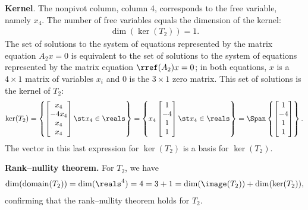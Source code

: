 {\textbf{Kernel}. The nonpivot column, column 4, corresponds to the free variable, namely $x_{4}$. The number of free variables equals the dimension of the kernel:
\begin{align*}
\dim(\ker(T_{2}))
=
1.
\end{align*}
The set of solutions to the system of equations represented by the matrix equation $A_{2} x = 0$ is equivalent to the set of solutions to the system of equations represented by the matrix equation $\rref(A_{2}) x = 0$; in both equations, $x$ is a $4 \times 1$ matrix of variables $x_{i}$ and $0$ is the $3 \times 1$ zero matrix. This set of solutions is the kernel of $T_{2}$:
\begin{align*}
\ker(T_{2})
=
\left\{
\begin{bmatrix}
x_{4}		\\
-4 x_{4}	\\
x_{4}		\\
x_{4}
\end{bmatrix}
\st
x_{4} \in \reals
\right\}
=
\left\{
x_{4}
\begin{bmatrix}
1	\\
-4	\\
1	\\
1
\end{bmatrix}
\st
x_{4} \in \reals
\right\}
=
\Span\left\{
\begin{bmatrix}
1	\\
-4	\\
1	\\
1
\end{bmatrix}
\right\}.
\end{align*}
The vector in this last expression for $\ker(T_{2})$ is a basis for $\ker(T_{2})$.

\textbf{Rank--nullity theorem.} For $T_{2}$, we have
\begin{align*}
\dim(\text{domain}(T_{2}))
=
\dim(\reals^{4})
=
4
=
3 + 1
=
\dim(\image(T_{2})) + \dim(\ker(T_{2})),
\end{align*}
confirming that the rank--nullity theorem holds for $T_{2}$.}%

